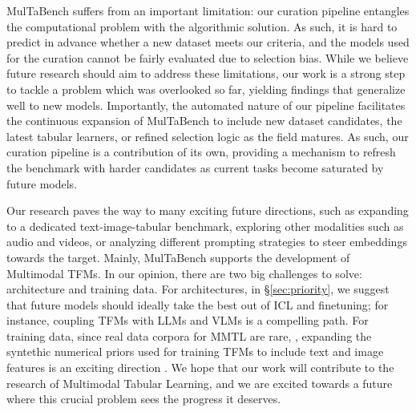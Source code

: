 \documentclass{llmxive}
\begin{document}
MulTaBench suffers from an important limitation: our curation pipeline entangles the computational problem with the algorithmic solution. As such, it is hard to predict in advance whether a new dataset meets our criteria, and the models used for the curation cannot be fairly evaluated due to selection bias. While we believe future research should aim to address these limitations, our work is a strong step to tackle a problem which was overlooked so far, yielding findings that generalize well to new models. Importantly, the automated nature of our pipeline facilitates the continuous expansion of MulTaBench to include new dataset candidates, the latest tabular learners, or refined selection logic as the field matures. As such, our curation pipeline is a contribution of its own, providing a mechanism to refresh the benchmark with harder candidates as current tasks become saturated by future models.


Our research paves the way to many exciting future directions, such as expanding to a dedicated text-image-tabular benchmark, exploring other modalities such as audio and videos, or analyzing different prompting strategies to steer embeddings towards the target. Mainly, MulTaBench supports the development of Multimodal TFMs. In our opinion, there are two big challenges to solve: architecture and training data. For architectures, in \S\ref{sec:priority}, we suggest that future models should ideally take the best out of ICL and finetuning; for instance, coupling TFMs with LLMs and VLMs is a compelling path. For training data, since real data corpora for MMTL are rare, \cite{eggert_tablib_2023}, expanding the syntethic numerical priors used for training TFMs \cite{hollmann_accurate_2025, zhang_mitra_2025, qu_tabiclv2_2026} to include text and image features is an exciting direction \cite{luo_can_2025, brahmavar_task_2026}. We hope that our work will contribute to the research of Multimodal Tabular Learning, and we are excited towards a future where this crucial problem sees the progress it deserves.
\end{document}
